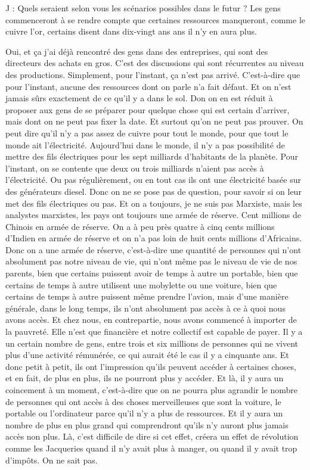 \begin{description}
\vspace{1\baselineskip}

J : Quels seraient selon vous les scénarios possibles dans le futur ? Les gens commenceront à se rendre compte que certaines ressources manqueront, comme le cuivre l'or, certains disent dans dix-vingt ans ans il n'y en aura plus.

\vspace{1\baselineskip}

Oui, et ça j'ai déjà rencontré des gens dans des entreprises, qui sont des directeurs des achats en gros. C'est des discussions qui sont récurrentes au niveau des productions. Simplement, pour l'instant, ça n'est pas arrivé. C'est-à-dire que pour l'instant, aucune des ressources dont on parle n'a fait défaut. Et on n'est jamais sûrs exactement de ce qu'il y a dans le sol. Don on en est réduit à proposer aux gens de se préparer pour quelque chose qui est certain d'arriver, mais dont on ne peut pas fixer la date. Et surtout qu'on ne peut pas prouver. On peut dire qu'il n'y a pas assez de cuivre pour tout le monde, pour que tout le monde ait l'électricité. Aujourd'hui dans le monde, il n'y a pas possibilité de mettre des fils électriques pour les sept milliards d’habitants de la planète. Pour l'instant, on se contente que deux ou trois milliards n'aient pas accès à l'électricité. Ou pas régulièrement, ou en tout cas ils ont une électricité basée sur des générateurs diesel. Donc on ne se pose pas de question, pour savoir si on leur met des fils électriques ou pas. Et on a toujours, je ne suis pas Marxiste, mais les analystes marxistes, les pays ont toujours une armée de réserve. Cent millions de Chinois en armée de réserve. On a à peu près quatre à cinq cents millions d'Indien en armée de réserve et on n’a pas loin de huit cents millions d'Africains. Donc on a une armée de réserve, c'est-à-dire une quantité de personnes qui n'ont absolument pas notre niveau de vie, qui n'ont même pas le niveau de vie de nos parents, bien que certains puissent avoir de temps à autre un portable, bien que certains de temps à autre utilisent une mobylette ou une voiture, bien que certains de temps à autre puissent même prendre l'avion, mais d'une manière générale, dans le long temps, ils n'ont absolument pas accès à ce à quoi nous avons accès. Et chez nous, en contrepartie, nous avons commencé à importer de la pauvreté. Elle n'est que financière et notre collectif est capable de payer. Il y a un certain nombre de gens, entre trois et six millions de personnes qui ne vivent plus d'une activité rémunérée, ce qui aurait été le cas il y a cinquante ans. Et donc petit à petit, ils ont l'impression qu'ils peuvent accéder à certaines choses, et en fait, de plus en plus, ils ne pourront plus y accéder. Et là, il y aura un coincement à un moment, c'est-à-dire que on ne pourra plus agrandir le nombre de personnes qui ont accès à des choses merveilleuses que sont la voiture, le portable ou l'ordinateur parce qu’il n'y a plus de ressources. Et il y aura un nombre de plus en plus grand qui comprendront qu'ils n'y auront plus jamais accès non plus. Là, c'est difficile de dire si cet effet, créera un effet de révolution comme les Jacqueries quand il n'y avait plus à manger, ou quand il y avait trop d'impôts. On ne sait pas.


\end{description}
